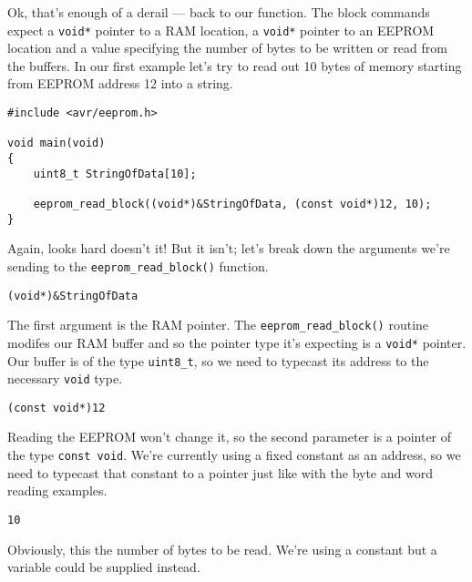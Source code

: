 \documentclass[a4paper,oneside,notitlepage]{book}
\begin{document}
Ok, that's enough of a derail --- back to our function. The block commands expect a \lstinline{void*} pointer to a RAM location, a \lstinline{void*} pointer to an EEPROM location and a value specifying the number of bytes to be written or read from the buffers. In our first example let's try to read out 10 bytes of memory starting from EEPROM address 12 into a string.

\begin{center}
\begin{lstlisting}
#include <avr/eeprom.h>

void main(void)
{
    uint8_t StringOfData[10];

    eeprom_read_block((void*)&StringOfData, (const void*)12, 10);
}
\end{lstlisting}
\end{center}

Again, looks hard doesn't it! But it isn't; let's break down the arguments we're sending to the \lstinline{eeprom_read_block()} function.

\begin{center}
\begin{lstlisting}
(void*)&StringOfData
\end{lstlisting}
\end{center}

The first argument is the RAM pointer. The \lstinline{eeprom_read_block()} routine modifes our RAM buffer and so the pointer type it's expecting is a \lstinline{void*} pointer. Our buffer is of the type \lstinline{uint8_t}, so we need to typecast its address to the necessary \lstinline{void} type.

\begin{center}
\begin{lstlisting}
(const void*)12
\end{lstlisting}
\end{center}

Reading the EEPROM won't change it, so the second parameter is a pointer of the type \lstinline{const void}. We're currently using a fixed constant as an address, so we need to typecast that constant to a pointer just like with the byte and word reading examples.

\begin{center}
\begin{lstlisting}
10
\end{lstlisting}
\end{center}

Obviously, this the number of bytes to be read. We're using a constant but a variable could be supplied instead.
\end{document}
